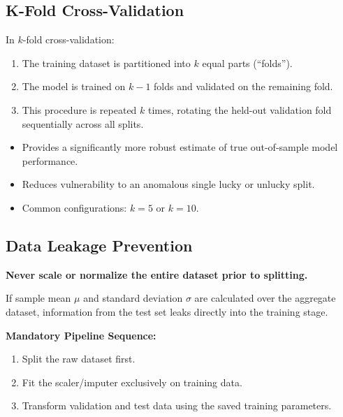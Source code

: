 \subsection{K-Fold Cross-Validation}
In $k$-fold cross-validation:
\begin{enumerate}[leftmargin=1.5em]
    \item The training dataset is partitioned into $k$ equal parts (\textquotedblleft folds\textquotedblright).
    \item The model is trained on $k-1$ folds and validated on the remaining fold.
    \item This procedure is repeated $k$ times, rotating the held-out validation fold sequentially across all splits.
\end{enumerate}

\begin{remarkbox}
\begin{itemize}[leftmargin=1.2em]
    \item Provides a significantly more robust estimate of true out-of-sample model performance.
    \item Reduces vulnerability to an anomalous single lucky or unlucky split.
    \item Common configurations: $k = 5$ or $k = 10$.
\end{itemize}
\end{remarkbox}

\subsection{Data Leakage Prevention}
\begin{takeawaybox}
\textbf{Never scale or normalize the entire dataset prior to splitting.}

If sample mean $\mu$ and standard deviation $\sigma$ are calculated over the aggregate dataset, information from the test set leaks directly into the training stage. 

\textbf{Mandatory Pipeline Sequence:}
\begin{enumerate}[leftmargin=1.2em]
    \item Split the raw dataset first.
    \item Fit the scaler/imputer exclusively on training data.
    \item Transform validation and test data using the saved training parameters.
\end{enumerate}
\end{takeawaybox}

